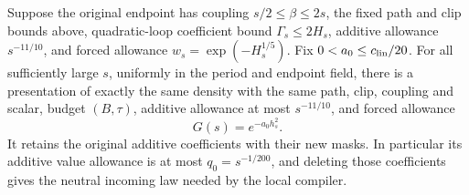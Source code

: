 \begin{proposition}
\label{prop:restart-endpoint}
Suppose the original endpoint has coupling $s/2\le\beta\le2s$, the
fixed path and clip bounds above, quadratic-loop coefficient bound
$\Gamma_s\le2H_s$, additive allowance $s^{-11/10}$, and forced allowance
$w_s=\exp(-H_s^{1/5})$. Fix
$0<a_0\le c_{\rm lin}/20$. For all sufficiently large $s$, uniformly
in the period and endpoint field, there is a presentation of exactly
the same density with the same path, clip, coupling and scalar, budget
$(B,\tau)$, additive allowance at most $s^{-11/10}$, and forced
allowance
\[
                         G(s)=e^{-a_0h_s^2}.
\]
It retains the original additive coefficients with their new masks.
In particular its additive value allowance is at most $q_0=s^{-1/200}$,
and deleting those coefficients gives the neutral incoming law needed
by the local compiler.
\end{proposition}


